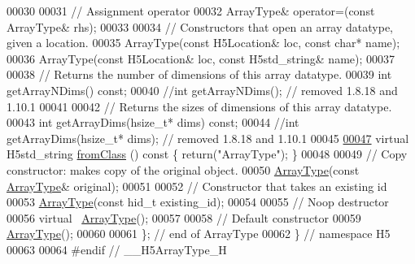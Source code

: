 \begin{DoxyCode}
00030 
00031         \textcolor{comment}{// Assignment operator}
00032         ArrayType& operator=(\textcolor{keyword}{const} ArrayType& rhs);
00033 
00034         \textcolor{comment}{// Constructors that open an array datatype, given a location.}
00035         ArrayType(\textcolor{keyword}{const} H5Location& loc, \textcolor{keyword}{const} \textcolor{keywordtype}{char}* name);
00036         ArrayType(\textcolor{keyword}{const} H5Location& loc, \textcolor{keyword}{const} H5std\_string& name);
00037 
00038         \textcolor{comment}{// Returns the number of dimensions of this array datatype.}
00039         \textcolor{keywordtype}{int} getArrayNDims() \textcolor{keyword}{const};
00040         \textcolor{comment}{//int getArrayNDims(); // removed 1.8.18 and 1.10.1}
00041 
00042         \textcolor{comment}{// Returns the sizes of dimensions of this array datatype.}
00043         \textcolor{keywordtype}{int} getArrayDims(hsize\_t* dims) \textcolor{keyword}{const};
00044         \textcolor{comment}{//int getArrayDims(hsize\_t* dims); // removed 1.8.18 and 1.10.1}
00045 
\hyperlink{class_h5_1_1_array_type_af1fff9817f1c205a2192241fd79e51c1}{00047}         \textcolor{keyword}{virtual} H5std\_string \hyperlink{class_h5_1_1_array_type_af1fff9817f1c205a2192241fd79e51c1}{fromClass} ()\textcolor{keyword}{ const }\{ \textcolor{keywordflow}{return}(\textcolor{stringliteral}{"ArrayType"}); \}
00048 
00049         \textcolor{comment}{// Copy constructor: makes copy of the original object.}
00050         \hyperlink{class_h5_1_1_array_type}{ArrayType}(\textcolor{keyword}{const} \hyperlink{class_h5_1_1_array_type}{ArrayType}& original);
00051 
00052         \textcolor{comment}{// Constructor that takes an existing id}
00053         \hyperlink{class_h5_1_1_array_type}{ArrayType}(\textcolor{keyword}{const} hid\_t existing\_id);
00054 
00055         \textcolor{comment}{// Noop destructor}
00056         \textcolor{keyword}{virtual} ~\hyperlink{class_h5_1_1_array_type}{ArrayType}();
00057 
00058         \textcolor{comment}{// Default constructor}
00059         \hyperlink{class_h5_1_1_array_type}{ArrayType}();
00060 
00061 \}; \textcolor{comment}{// end of ArrayType}
00062 \} \textcolor{comment}{// namespace H5}
00063 
00064 \textcolor{preprocessor}{#endif // \_\_H5ArrayType\_H}
\end{DoxyCode}
